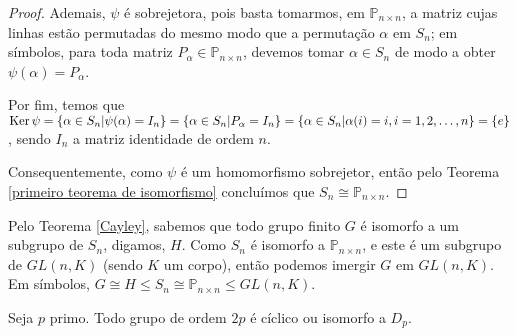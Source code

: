 \begin{proof}
		\par\vspace{0.3cm}
		
		Ademais, $\psi$ é sobrejetora, pois basta tomarmos, em $\mathbb{P}_{n\times n}$, a matriz cujas linhas estão permutadas do mesmo modo que a permutação $\alpha$ em $S_n$; em símbolos, para toda matriz $P_{\alpha}\in\mathbb{P}_{n\times n}$, devemos tomar $\alpha\in S_n$ de modo a obter $\psi(\alpha) = P_{\alpha}$. 
		
		\par\vspace{0.3cm}
		
		Por fim, temos que $\operatorname{Ker}\psi = \{ \alpha\in S_n | \psi(\alpha) = I_n \} = \{ \alpha\in S_n | P_{\alpha} = I_n \} = \{ \alpha\in S_n | \alpha(i) = i, i=1,2,\dots,n \} = \{e\}$, sendo $I_n$ a matriz identidade de ordem $n$.
		
		\par\vspace{0.3cm}
		
		Consequentemente, como $\psi$ é um homomorfismo sobrejetor, então pelo Teorema \eqref{primeiro teorema de isomorfismo} concluímos que $S_n\cong\mathbb{P}_{n\times n}$.
	\end{proof}
	
	\par\vspace{0.3cm}
	
	\begin{remark}
		Pelo Teorema \eqref{Cayley}, sabemos que todo grupo finito $G$ é isomorfo a um subgrupo de $S_n$, digamos, $H$. Como $S_n$ é isomorfo a $\mathbb{P}_{n\times n}$, e este é um subgrupo de $GL(n,K)$ (sendo $K$ um corpo), então podemos imergir $G$ em $GL(n,K)$. Em símbolos, $G\cong H\leq S_n\cong\mathbb{P}_{n\times n}\leq GL(n,K)$.
	\end{remark}
	
	\par\vspace{0.3cm}
	
	\begin{lemma}
		\label{grupos de ordem 2p}
		Seja $p$ primo. Todo grupo de ordem $2p$ é cíclico ou isomorfo a $D_p$.
	\end{lemma}
	
